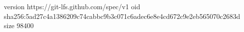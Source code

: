 version https://git-lfs.github.com/spec/v1
oid sha256:5ad27c4a1386209c74cabbc9b3c071c6adec6e8e4cd672c9e2eb565070c2683d
size 98400
